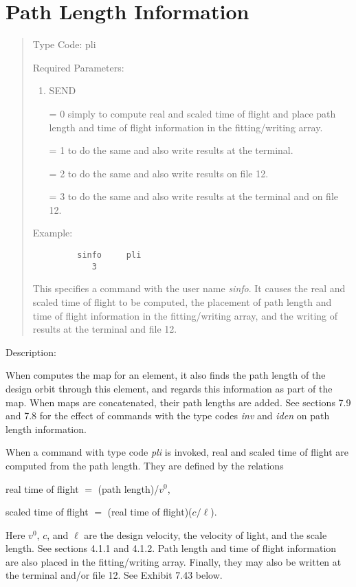 \section{Path Length Information}
\begin{quotation}
\noindent Type Code:  pli  
\vspace{5mm}

\noindent Required Parameters:
\begin{enumerate}
      \item SEND

             = 0 simply to compute real and scaled time of flight and
			 place path length \hspace*{1em}and time of flight information in the
			 fitting/writing array.

			 = 1 to do the same and also write results at the terminal.

			 = 2 to do the same and also write results on file 12.

			 = 3 to do the same and also write results at the terminal and on file 12.
\end{enumerate}

\vspace{5mm}
\noindent Example:
\begin{verbatim}
         sinfo     pli
            3
\end{verbatim}

This specifies a command with the user name {\em sinfo}.  It causes the real and scaled time of flight to be computed, the placement of path length and time of flight information in the fitting/writing array, and the writing of results at the terminal and file 12.
\end{quotation}

\vspace{5mm}
     Description:
\vspace{2mm}

When \Mary computes the map for an element, it also finds the path length of the design orbit through this element, and regards this information as part of the map.  When maps are concatenated, their path lengths are added.  See sections 7.9 and 7.8 for the effect of commands with the type codes {\em inv} and {\em iden} on path length information.

When a command with type code {\em pli} is invoked, real and scaled time of flight are computed from the path length.  They are defined by the relations
\begin{center}
real time of flight $=$ (path length)/$v^0$,
\end{center}
\begin{center}
scaled time of flight $=$ (real time of flight)($c/\ell$).
\end{center}
Here $v^0$, $c$, and $\ell$ are the design velocity, the velocity of light, and the scale length.   See sections 4.1.1 and 4.1.2.  Path length and time of flight information are also placed in the fitting/writing array.  Finally, they may also be written at the terminal and/or file 12.  See Exhibit 7.43 below.


